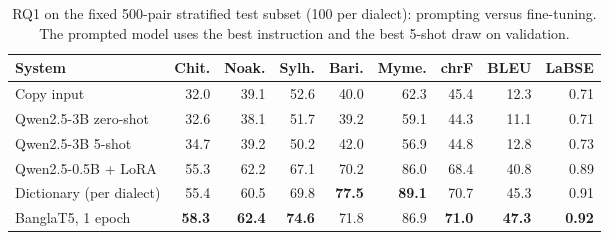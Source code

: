 \begin{table}[t]\centering\small
\begin{tabular}{@{}lrrrrrrrr@{}}\toprule
System & Chit. & Noak. & Sylh. & Bari. & Myme. & chrF & BLEU & LaBSE\\\midrule
Copy input & 32.0 & 39.1 & 52.6 & 40.0 & 62.3 & 45.4 & 12.3 & 0.71\\
\addlinespace[1pt]
Qwen2.5-3B zero-shot & 32.6 & 38.1 & 51.7 & 39.2 & 59.1 & 44.3 & 11.1 & 0.71\\
Qwen2.5-3B 5-shot & 34.7 & 39.2 & 50.2 & 42.0 & 56.9 & 44.8 & 12.8 & 0.73\\
Qwen2.5-0.5B + LoRA & 55.3 & 62.2 & 67.1 & 70.2 & 86.0 & 68.4 & 40.8 & 0.89\\
Dictionary (per dialect) & 55.4 & 60.5 & 69.8 & \textbf{77.5} & \textbf{89.1} & 70.7 & 45.3 & 0.91\\
BanglaT5, 1 epoch & \textbf{58.3} & \textbf{62.4} & \textbf{74.6} & 71.8 & 86.9 & \textbf{71.0} & \textbf{47.3} & \textbf{0.92}\\
\bottomrule\end{tabular}
\caption{RQ1 on the fixed 500-pair stratified test subset (100 per dialect): prompting versus fine-tuning. The prompted model uses the best instruction and the best 5-shot draw on validation.}\label{tab:sub500}
\end{table}
